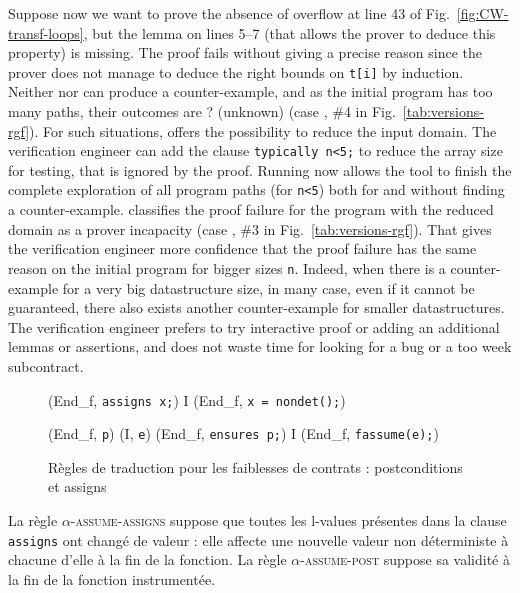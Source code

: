Suppose now we want to prove the absence of overflow at line 43
of Fig.~\ref{fig:CW-transf-loops}, but the lemma on lines 5--7 
(that allows the prover to deduce this property) is missing.
The proof fails  without giving a precise reason since
the prover does not manage to deduce the right bounds on \lstinline{t[i]} by induction.
Neither \NCD nor \CWD can produce a counter-example, and
as the initial program has too many paths, their outcomes are \textsf{?}
(unknown) (case , \#4 in Fig.~\ref{tab:versions-rgf}).
For such situations, \stady offers the possibility to reduce the input domain.
The verification engineer can add the \acsl clause 
\lstinline'typically n<5;' to reduce the array size 
for testing, that is ignored by the proof. 
Running \stady now allows the tool to finish the complete exploration of all
program paths (for \lstinline'n<5') both for \NCD and \CWD without finding a counter-example.
\stady classifies the proof failure for the program with 
the reduced domain as a prover incapacity (case ,
\#3 in Fig.~\ref{tab:versions-rgf}).
That gives the verification engineer more confidence that the proof failure
has the same reason on the initial program for bigger sizes \lstinline{n}.
Indeed, when there is a counter-example for a very big datastructure size, 
in many case,  even if it cannot be guaranteed, 
there also exists another counter-example for smaller datastructures. 
The verification engineer prefers to  try interactive proof or adding an additional lemmas or assertions,
and does not waste time for looking for a bug or a too week subcontract.




\begin{figure}[bt]
  \scriptsize{
    {
      {}
      {(End_f, \mbox{\lstinline'assigns x;'})
        I \concat (End_f, \mbox{\lstinline'x = nondet();'})}{}
    }

    {
      {(End_f, \mbox{\lstinline'p'})  (I, \mbox{\lstinline'e'})}
      {(End_f, \mbox{\lstinline'ensures p;'})
        I \concat (End_f, \mbox{\lstinline'fassume(e);'})}{}
    }
  }
  \caption{Règles de traduction pour les faiblesses de contrats :
    postconditions et assigns}
  \label{fig:assume-annot}
\end{figure}

La règle \textsc{$\alpha$-assume-assigns} suppose que toutes les l-values
présentes dans la clause \lstinline'assigns' ont changé de valeur : elle affecte
une nouvelle valeur non déterministe à chacune d'elle à la fin de la fonction.
La règle \textsc{$\alpha$-assume-post} suppose sa validité à la fin de la
fonction instrumentée.

